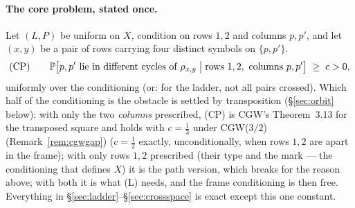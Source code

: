 \paragraph{The core problem, stated once.}  Let $(L,P)$ be uniform on
$X$, condition on rows $1,2$ and columns $p,p'$, and let $(x,y)$ be a
pair of rows carrying four distinct symbols on $\{p,p'\}$.
\begin{equation}\label{eq:CP}
\textup{(CP)}\qquad
\Pr\bigl[p,p'\text{ lie in different cycles of }\rho_{x,y}\bigm|\text{rows }1,2,\ \text{columns }p,p'\bigr]\;\ge\;c>0 ,
\end{equation}
uniformly over the conditioning (or: for the ladder, not all pairs
crossed).  Which half of the conditioning is the obstacle is settled
by transposition (\S\ref{sec:orbit} below): with only the two
\emph{columns} prescribed, (CP) is CGW's Theorem~3.13 for the
transposed square and holds with $c=\frac13$ under CGW($3/2$)
(Remark~\ref{rem:cgwgap}) ($c=\frac12$ exactly, unconditionally, when
rows $1,2$ are apart in the frame); with only rows $1,2$ prescribed
(their type and the mark --- the conditioning that defines $X$) it is
the path version, which breaks for the reason above; with both it is
what (L) needs, and the frame conditioning is then free.  Everything
in \S\ref{sec:ladder}--\S\ref{sec:crossspace} is exact except this one
constant.

